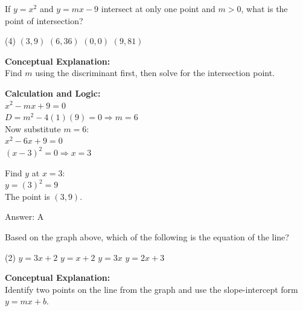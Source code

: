 \documentclass[11pt,paper=a4,answers]{exam}
\begin{document}
\begin{questions}
\question
If $y = x^2$ and $y = mx - 9$ intersect at only one point and $m > 0$, what is the point of intersection?
\begin{tasks}(4)
    \task $(3, 9)$
    \task $(6, 36)$
    \task $(0, 0)$
    \task $(9, 81)$
\end{tasks}

\begin{solution}
\textbf{Conceptual Explanation:} \\
Find $m$ using the discriminant first, then solve for the intersection point.

\vspace{20pt}

\textbf{Calculation and Logic:} \\
$x^2 - mx + 9 = 0$ \\
$D = m^2 - 4(1)(9) = 0 \Rightarrow m = 6$ \\
Now substitute $m = 6$: \\
$x^2 - 6x + 9 = 0$ \\
$(x - 3)^2 = 0 \Rightarrow x = 3$

\vspace{10pt}

Find $y$ at $x = 3$: \\
$y = (3)^2 = 9$ \\
The point is $(3, 9)$.

\vspace{25pt}

Answer: \colorbox{yellow!100}{A}
\end{solution}

\vspace{40pt}

\question

Based on the graph above, which of the following is the equation of the line?
\begin{tasks}(2)
    \task $y = 3x + 2$
    \task $y = x + 2$
    \task $y = 3x$
    \task $y = 2x + 3$
\end{tasks}

\begin{solution}
\textbf{Conceptual Explanation:} \\
Identify two points on the line from the graph and use the slope-intercept form $y = mx + b$.

\vspace{20pt}


\end{solution}
\end{questions}
\end{document}
